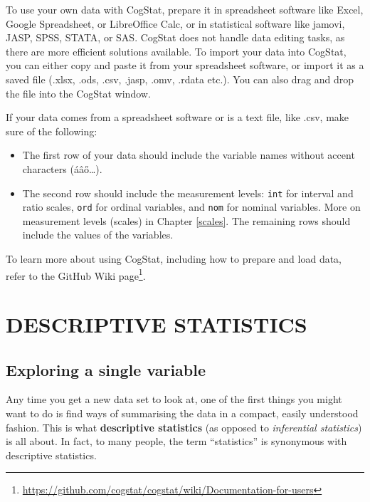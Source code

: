 \documentclass[
  11pt,
  a4paper,
  twoside,symmetric,openright]{book}
\providecommand{\tightlist}{%
  \setlength{\itemsep}{0pt}\setlength{\parskip}{0pt}}
\theoremstyle{break}
\theoremstyle{break}
\DeclareRobustCommand{\href}[2]{#2\footnote{\url{#1}}}
\begin{document}
To use your own data with CogStat, prepare it in spreadsheet software like Excel, Google Spreadsheet, or LibreOffice Calc, or in statistical software like jamovi, JASP, SPSS, STATA, or SAS. CogStat does not handle data editing tasks, as there are more efficient solutions available. To import your data into CogStat, you can either copy and paste it from your spreadsheet software, or import it as a saved file (.xlsx, .ods, .csv, .jasp, .omv, .rdata etc.). You can also drag and drop the file into the CogStat window.

If your data comes from a spreadsheet software or is a text file, like .csv, make sure of the following:

\begin{itemize}
\tightlist
\item
  The first row of your data should include the variable names without accent characters (áâő\ldots).
\item
  The second row should include the measurement levels: \texttt{int} for interval and ratio scales, \texttt{ord} for ordinal variables, and \texttt{nom} for nominal variables. More on measurement levels (scales) in Chapter \ref{scales}. The remaining rows should include the values of the variables.
\end{itemize}

To learn more about using CogStat, including how to prepare and load data, refer to the \href{https://github.com/cogstat/cogstat/wiki/Documentation-for-users}{GitHub Wiki page}.

\hypertarget{part-descriptive-statistics}{%
\part*{DESCRIPTIVE STATISTICS}\label{part-descriptive-statistics}}

\hypertarget{exploringavariable}{%
\chapter{Exploring a single variable}\label{exploringavariable}}

Any time you get a new data set to look at, one of the first things you might want to do is find ways of summarising the data in a compact, easily understood fashion. This is what \textbf{descriptive statistics} (as opposed to \emph{inferential statistics}) is all about. In fact, to many people, the term ``statistics'' is synonymous with descriptive statistics.
\end{document}
